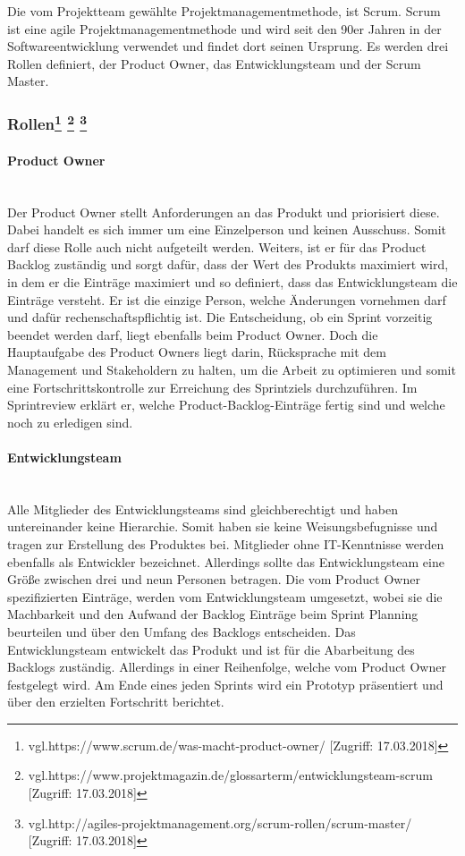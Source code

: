 Die vom Projektteam gewählte Projektmanagementmethode, ist Scrum. Scrum ist eine agile Projektmanagementmethode und wird seit den 90er Jahren in der Softwareentwicklung verwendet und findet dort seinen Ursprung. Es werden drei Rollen definiert, der Product Owner, das Entwicklungsteam und der Scrum Master. 

\subsubsection[Rollen]{Rollen\protect\footnote{\label{foot:2}vgl.https://www.scrum.de/was-macht-product-owner/ [Zugriff: 17.03.2018]} \protect\footnote{\label{foot:2}vgl.https://www.projektmagazin.de/glossarterm/entwicklungsteam-scrum [Zugriff: 17.03.2018]} \protect\footnote{\label{foot:2}vgl.http://agiles-projektmanagement.org/scrum-rollen/scrum-master/ [Zugriff: 17.03.2018]}}   
\paragraph{Product Owner}
\leavevmode \\
Der Product Owner stellt Anforderungen an das Produkt und priorisiert diese. Dabei handelt es sich immer um eine Einzelperson und keinen Ausschuss. Somit darf diese Rolle auch nicht aufgeteilt werden. Weiters, ist er für das Product Backlog zuständig und sorgt dafür, dass der Wert des Produkts maximiert wird, in dem er die Einträge maximiert und so definiert, dass das Entwicklungsteam die Einträge versteht. Er ist die einzige Person, welche Änderungen vornehmen darf und dafür rechenschaftspflichtig ist. Die Entscheidung, ob ein Sprint vorzeitig beendet werden darf, liegt ebenfalls beim Product Owner. Doch die Hauptaufgabe des Product Owners liegt darin, Rücksprache mit dem Management und Stakeholdern zu halten, um die Arbeit zu optimieren und somit eine Fortschrittskontrolle zur Erreichung des Sprintziels durchzuführen. Im Sprintreview erklärt er, welche Product-Backlog-Einträge fertig sind und welche noch zu erledigen sind. 

\paragraph{Entwicklungsteam}
\leavevmode \\
Alle Mitglieder des Entwicklungsteams sind gleichberechtigt und haben untereinander keine Hierarchie. Somit haben sie keine Weisungsbefugnisse und tragen zur Erstellung des Produktes bei. Mitglieder ohne IT-Kenntnisse werden ebenfalls als Entwickler bezeichnet. Allerdings sollte das Entwicklungsteam eine Größe zwischen drei und neun Personen betragen. Die vom Product Owner spezifizierten Einträge, werden vom Entwicklungsteam umgesetzt, wobei sie die Machbarkeit und den Aufwand der Backlog Einträge beim Sprint Planning beurteilen und über den Umfang des Backlogs entscheiden. Das Entwicklungsteam entwickelt das Produkt und ist für die Abarbeitung des Backlogs zuständig. Allerdings in einer Reihenfolge, welche vom Product Owner festgelegt wird. Am Ende eines jeden Sprints wird ein Prototyp präsentiert und über den erzielten Fortschritt berichtet. 


